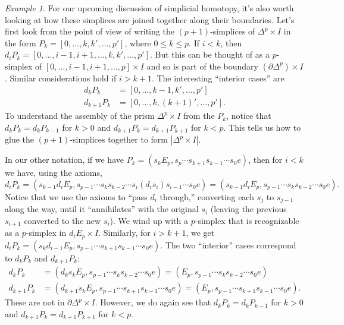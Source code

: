 \documentclass[12pt]{article}
\theoremstyle{plain}
\theoremstyle{definition}
\theoremstyle{remark}
\newtheorem{example}[theorem]{Example}
\newcommand{\bd}{\partial}
\begin{document}
\begin{example}
For our upcoming discussion of simplicial homotopy, it's also worth looking at how these simplices are joined together along their boundaries. Let's first look from the point of view of writing the $(p+1)$-simplices of $\Delta^p\times I$ in the form $P_k=[0,\ldots, k,k',\ldots, p']$, where $0\leq k\leq p$. If $i<k$, then $d_iP_k=[0,\ldots,i-1,i+1,\ldots,k,k',\ldots, p']$. But this can be thought of as a $p$-simplex of $[0,\ldots,i-1,i+1,\ldots, p]\times I$ and so is part of the boundary $(\bd \Delta^p)\times I$. Similar considerations hold if $i>k+1$. The interesting ``interior cases'' are
\begin{align*}
d_kP_k&=[0,\ldots,k-1,k',\ldots,p']\\
d_{k+1}P_k&=[0,\ldots,k,(k+1)',\ldots,p'].
\end{align*}
To understand the assembly of the prism $\Delta^p\times I$ from the $P_k$,  notice that $d_kP_k=d_kP_{k-1}$ for $k>0$ and $d_{k+1}P_k=d_{k+1} P_{k+1}$ for $k<p$. This tells us how to glue the $(p+1)$-simplices together to form $|\Delta^p\times I|$. 

In our other notation, if we have 
$P_k=(s_k E_p, s_{p}\cdots s_{k+1}s_{k-1} \cdots s_{0} e)$, then for $i<k$ we have, using the axioms, $$d_iP_k=(s_{k-1}d_i E_p, s_{p-1}\cdots  s_{k}s_{k-2}\cdots s_i (d_is_i)s_{i-1}\cdots s_{0} e)=(s_{k-1}d_i E_p, s_{p-1}\cdots s_{k}s_{k-2} \cdots s_{0} e).$$ Notice that we use the axioms to   ``pass $d_i$ through,'' converting each $s_j$ to $s_{j-1}$ along the way, until it ``annihilates'' with the original $s_i$ (leaving the previous $s_{i+1}$ converted to the new $s_i$). We wind up with a $p$-simplex that is recognizable as a $p$-simplex in $d_iE_p\times I$. Similarly, for $i>k+1$, we get $d_iP_k=(s_{k}d_{i-1} E_p, s_{p-1}\cdots s_{k+1}s_{k-1} \cdots s_{0} e)$. The two ``interior'' cases correspond to $d_kP_k$ and $d_{k+1}P_k$:
\begin{align*}
d_kP_k&=(d_ks_k E_p, s_{p-1}\cdots s_{k}s_{k-2} \cdots s_{0} e)=(E_p, s_{p-1}\cdots s_{k}s_{k-2} \cdots s_{0} e)\\
d_{k+1}P_k&=(d_{k+1}s_k E_p, s_{p-1}\cdots s_{k+1}s_{k-1} \cdots s_{0} e)=(E_p, s_{p-1}\cdots s_{k+1}s_{k-1} \cdots s_{0} e).
\end{align*}
These are not in $\bd \Delta^p\times I$. However, we do again see that $d_kP_k=d_kP_{k-1}$ for $k>0$ and $d_{k+1}P_k=d_{k+1} P_{k+1}$ for $k<p$.
\end{example}
\end{document}
